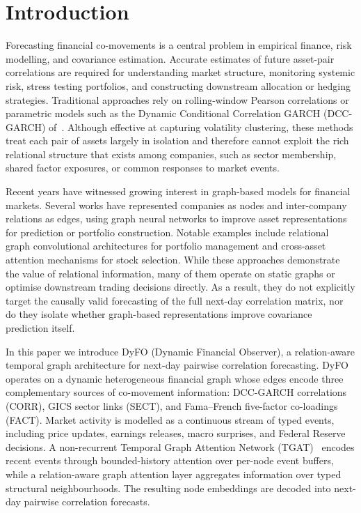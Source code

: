 \documentclass[runningheads]{llncs}
\begin{document}
%
%
%

\section{Introduction}\label{sec:introduction}


Forecasting financial co-movements is a central problem in empirical finance, risk modelling, and covariance estimation. Accurate estimates of future
asset-pair correlations are required for understanding market structure, monitoring systemic risk, stress testing portfolios, and constructing
downstream allocation or hedging strategies. Traditional approaches rely on rolling-window Pearson correlations or parametric models such as the Dynamic Conditional Correlation GARCH (DCC-GARCH) of~\cite{engle2002dynamic}. Although effective at capturing volatility clustering, these methods treat each pair of assets largely in isolation and therefore cannot exploit the rich relational structure that exists among companies, such as sector membership, shared factor exposures, or common responses to market events.

Recent years have witnessed growing interest in graph-based models for financial markets. Several works have represented companies as nodes and
inter-company relations as edges, using graph neural networks to improve asset representations for prediction or portfolio construction. Notable
examples include relational graph convolutional architectures for portfolio management and cross-asset attention mechanisms for stock selection. While these approaches demonstrate the value of relational information, many of them operate on static graphs or optimise downstream trading decisions directly. As a result, they do not explicitly target the causally valid forecasting of the full next-day correlation matrix, nor do they isolate whether graph-based representations improve covariance prediction itself.

In this paper we introduce DyFO (Dynamic Financial Observer), a relation-aware temporal graph architecture for next-day pairwise correlation
forecasting. DyFO operates on a dynamic heterogeneous financial graph whose edges encode three complementary sources of co-movement information:
DCC-GARCH correlations (CORR), GICS sector links (SECT), and Fama--French five-factor co-loadings (FACT). Market activity is modelled as a continuous
stream of typed events, including price updates, earnings releases, macro surprises, and Federal Reserve decisions. A non-recurrent Temporal Graph
Attention Network (TGAT)~\cite{xu2020inductive} encodes recent events through bounded-history attention over per-node event buffers, while a relation-aware graph attention layer aggregates information over typed structural neighbourhoods. The resulting node embeddings are decoded into next-day pairwise correlation forecasts.
\end{document}
